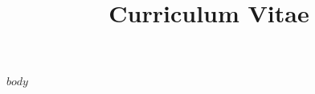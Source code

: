\documentclass[11pt,a4paper,sans]{moderncv}        %
\title{Curriculum Vitae}                           %
\begin{document}
\makecvtitle

$body$
\end{document}
